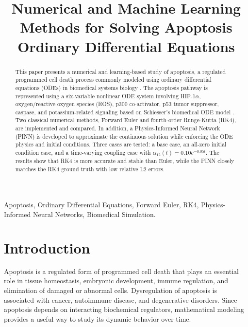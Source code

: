 \documentclass[conference]{IEEEtran}
\begin{document}
\title{Numerical and Machine Learning Methods for Solving Apoptosis Ordinary Differential Equations}

\author{
}

\maketitle

\begin{abstract}
This paper presents a numerical and learning-based study of apoptosis, a regulated programmed cell death process commonly modeled using ordinary differential equations (ODEs) in biomedical systems biology \cite{kutumova2025,burt2022}. The apoptosis pathway is represented using a six-variable nonlinear ODE system involving HIF-1$\alpha$, oxygen/reactive oxygen species (ROS), p300 co-activator, p53 tumor suppressor, caspase, and potassium-related signaling based on Schiesser's biomedical ODE model \cite{schiesser2014}. Two classical numerical methods, Forward Euler and fourth-order Runge-Kutta (RK4), are implemented and compared. In addition, a Physics-Informed Neural Network (PINN) is developed to approximate the continuous solution while enforcing the ODE physics and initial conditions. Three cases are tested: a base case, an all-zero initial condition case, and a time-varying coupling case with $\alpha_{12}(t)=0.10e^{-0.05t}$. The results show that RK4 is more accurate and stable than Euler, while the PINN closely matches the RK4 ground truth with low relative L2 errors.
\end{abstract}

\begin{IEEEkeywords}
Apoptosis, Ordinary Differential Equations, Forward Euler, RK4, Physics-Informed Neural Networks, Biomedical Simulation.
\end{IEEEkeywords}

\section{Introduction}
Apoptosis is a regulated form of programmed cell death that plays an essential role in tissue homeostasis, embryonic development, immune regulation, and elimination of damaged or abnormal cells. Dysregulation of apoptosis is associated with cancer, autoimmune disease, and degenerative disorders. Since apoptosis depends on interacting biochemical regulators, mathematical modeling provides a useful way to study its dynamic behavior over time.
\end{document}
